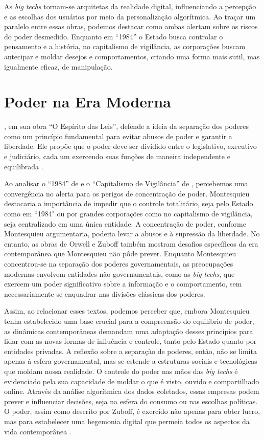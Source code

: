 \documentclass[
	12pt,
	openright,
	twoside,
	a4paper,
	english,
	french,
	spanish,
	brazil
]{abntex2}
\begin{document}
  As \textit{big techs} tornam-se arquitetas da realidade
  digital, influenciando a percepção e as escolhas dos usuários por meio da
  personalização algorítmica. Ao traçar um paralelo entre essas obras, podemos
  destacar como ambas alertam sobre os riscos do poder desmedido. Enquanto em
  ``1984'' o Estado busca controlar o pensamento e a história, no capitalismo
  de vigilância, as corporações buscam antecipar e moldar desejos e
  comportamentos, criando uma forma mais sutil, mas igualmente eficaz, de
  manipulação.


  \section{Poder na Era Moderna}

  , em sua obra ``O Espírito das
  Leis'', defende a ideia da separação dos poderes como um princípio fundamental
  para evitar abusos de poder e garantir a liberdade. Ele propõe que o poder
  deve ser dividido entre o legislativo, executivo e judiciário, cada um
  exercendo suas funções de maneira independente e equilibrada
  \cite{montesquieu-espirito-leis}.

  Ao analisar o ``1984'' de  e o ``Capitalismo de
  Vigilância'' de , percebemos
  uma convergência no alerta para os perigos de concentração de poder.
  Montesquieu destacaria a importância de impedir que o controle totalitário,
  seja pelo Estado como em ``1984" ou por grandes corporações como no
  capitalismo de vigilância, seja centralizado em uma única entidade. A
  concentração de poder, conforme Montesquieu argumentaria, poderia levar a
  abusos e à supressão da liberdade. No entanto, as obras de Orwell e Zuboff
  também mostram desafios específicos da era contemporânea que Montesquieu não
  pôde prever. Enquanto Montesquieu concentrou-se na separação dos poderes
  governamentais, as preocupações modernas envolvem entidades não
  governamentais, como as \textit{big techs}, que exercem um poder significativo
  sobre a informação e o comportamento, sem necessariamente se enquadrar nas
  divisões clássicas dos poderes.

  Assim, ao relacionar esses textos, podemos perceber que, embora Montesquieu
  tenha estabelecido uma base crucial para a compreensão do equilíbrio de poder,
  as dinâmicas contemporâneas demandam uma adaptação desses princípios para
  lidar com as novas formas de influência e controle, tanto pelo Estado quanto
  por entidades privadas. A reflexão sobre a separação de poderes, então, não
  se limita apenas à esfera governamental, mas se estende a estruturas sociais e
  tecnológicas que moldam nossa realidade. O controle do poder nas mãos das
  \textit{big techs} é evidenciado pela sua capacidade de moldar o que é visto,
  ouvido e compartilhado online. Através da análise algorítmica dos dados
  coletados, essas empresas podem prever e influenciar decisões, seja na esfera
  do consumo ou nas escolhas políticas. O poder, assim como descrito por Zuboff,
  é exercido não apenas para obter lucro, mas para estabelecer uma hegemonia
  digital que permeia todos os aspectos da vida contemporânea
  \cite{zuboff-capitalismo-vigilancia}.
\end{document}
